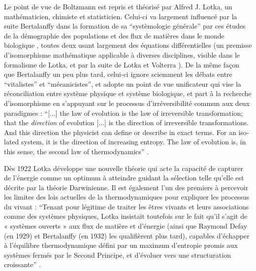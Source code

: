 Le point de vue de Boltzmann est repris et théorisé par Alfred J. Lotka, un mathématicien, chimiste et statisticien. Celui-ci va largement influencé par la suite Bertalanffy dans la formation de sa \enquote{systèmologie générale} \autocite[178]{Pouvreau2013} par ces études de la démographie des populations et des flux de matières dans le monde biologique \autocite[545-546]{Pouvreau2013}, toutes deux usant largement des équations différentielles (un premisse d'isomorphisme mathématique applicable à diverses disciplines, visible dans le formalisme de Lotka, et par la suite de Lotka et Volterra \autocite[550]{Pouvreau2013}). De la même façon que Bertalanffy un peu plus tard, celui-ci ignore sciemment les débats entre \enquote{vitalistes} et \enquote{mécanicistes}, et adopte un point de vue unificateur qui vise la réconciliation entre système physique et système biologique, et part à la recherche d'isomorphisme en s'appuyant sur le processus d'irréversibilité commun aux deux paradigmes : \foreignquote{english}{[...] the law of evolution is the law of irreversible transformation; that the \textit{direction} of evolution [...] is the direction of irreversible transformations. And this direction the physicist can define or describe in exact terms. For an isolated system, it is the direction of increasing entropy.  The law of evolution is, in this sense, the second law of thermodynamics} \autocite[26]{Lotka1925}.

Dès 1922 Lotka \autocites{Lotka1922a, Lotka1922b} développe une nouvelle théorie qui acte la capacité de capturer de l'énergie comme un optimum à atteindre guidant la sélection telle qu'elle est décrite par la théorie Darwinienne. Il est également l'un des premiers à percevoir les limites des lois actuelles de la thermodynamiques pour expliquer les processus du vivant : \enquote{Tenant pour légitime de traiter les êtres vivants et leurs associations comme des systèmes physiques, Lotka insistait toutefois sur le fait qu’il s’agit de « systèmes ouverts » aux flux de matière et d’énergie (ainsi que Raymond Defay (en 1929) et Bertalanffy (en 1932) les qualifièrent plus tard), capables d’échapper à l’équilibre thermodynamique défini par un maximum d’entropie promis aux systèmes fermés par le Second Principe, et d’évoluer vers une structuration croissante} \autocite[179]{Pouvreau2013}.

